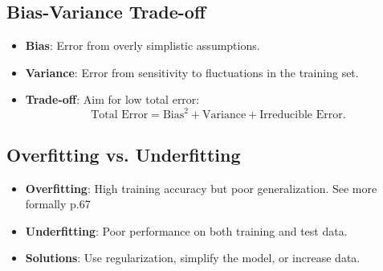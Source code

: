 \documentclass[10pt,a4paper]{article}
\begin{document}



\subsection*{Bias-Variance Trade-off}
\begin{itemize}
    \item \textbf{Bias}: Error from overly simplistic assumptions.
    \item \textbf{Variance}: Error from sensitivity to fluctuations in the training set.
    \item \textbf{Trade-off}: Aim for low total error:
    \[
    \text{Total Error} = \text{Bias}^2 + \text{Variance} + \text{Irreducible Error}.
    \]
\end{itemize}



\subsection*{Overfitting vs. Underfitting}
\begin{itemize}
    \item \textbf{Overfitting}: High training accuracy but poor generalization. See more formally p.67
    \item \textbf{Underfitting}: Poor performance on both training and test data.
    \item \textbf{Solutions}: Use regularization, simplify the model, or increase data.
\end{itemize}
\end{document}
